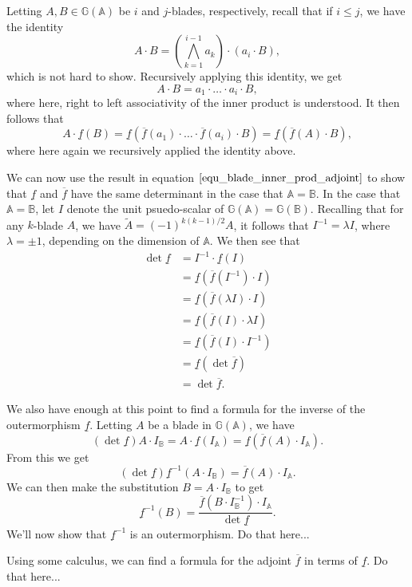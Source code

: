 \documentclass[12pt]{article}
\newcommand{\G}{\mathbb{G}}
\newcommand{\A}{\mathbb{A}}
\newcommand{\B}{\mathbb{B}}
\newcommand{\ob}{\overline}
\newcommand{\ub}{\underline}
\begin{document}
Letting $A,B\in\G(\A)$ be $i$ and $j$-blades, respectively, recall that if $i\leq j$, we
have the identity
\begin{equation*}
A\cdot B = \left(\bigwedge_{k=1}^{i-1}a_k\right)\cdot(a_i\cdot B),
\end{equation*}
which is not hard to show.  Recursively applying this identity, we get
\begin{equation*}
A\cdot B = a_1\cdot\dots\cdot a_i\cdot B,
\end{equation*}
where here, right to left associativity of the inner product is understood.
It then follows that
\begin{equation}\label{equ_blade_inner_prod_adjoint}
A\cdot\ub{f}(B) = \ub{f}\left(\ob{f}(a_1)\cdot\dots\cdot\ob{f}(a_i)\cdot B\right) = \ub{f}(\ob{f}(A)\cdot B),
\end{equation}
where here again we recursively applied the identity above.

We can now use the
result in equation $\eqref{equ_blade_inner_prod_adjoint}$ to show that $\ub{f}$ and $\ob{f}$
have the same determinant in the case that $\A=\B$.  In the case that $\A=\B$, let $I$
denote the unit psuedo-scalar of $\G(\A)=\G(\B)$.  
Recalling that for any $k$-blade $A$, we have $\tilde{A}=(-1)^{k(k-1)/2}A$, it follows
that $I^{-1}=\lambda I$, where $\lambda = \pm 1$, depending on the dimension of $\A$.
We then see that
\begin{align*}
\det\ub{f} &= I^{-1}\cdot\ub{f}(I) \\
 &= \ub{f}(\ob{f}(I^{-1})\cdot I) \\
 &= \ub{f}(\ob{f}(\lambda I)\cdot I) \\
 &= \ub{f}(\ob{f}(I)\cdot\lambda I) \\
 &= \ub{f}(\ob{f}(I)\cdot I^{-1}) \\
 &= \ub{f}(\det\ob{f}) \\
 &= \det\ob{f}.
\end{align*}

We also have enough at this point to find a formula for the inverse of
the outermorphism $\ub{f}$.  Letting $A$ be a blade in $\G(\A)$,
we have
\begin{equation*}
(\det\ub{f})A\cdot I_{\B} = A\cdot\ub{f}(I_{\A}) = \ub{f}(\ob{f}(A)\cdot I_{\A}).
\end{equation*}
From this we get
\begin{equation*}
(\det\ub{f})\ub{f}^{-1}(A\cdot I_{\B}) = \ob{f}(A)\cdot I_{\A}.
\end{equation*}
We can then make the substitution $B=A\cdot I_{\B}$ to get
\begin{equation}\label{equ_inv_of_outermorphism}
\ub{f}^{-1}(B) = \frac{\ob{f}(B\cdot I^{-1}_{\B})\cdot I_{\A}}{\det\ub{f}}.
\end{equation}
We'll now show that $\ub{f}^{-1}$ is an outermorphism.  Do that here...

Using some calculus, we can find a formula for the adjoint $\ob{f}$ in terms of $\ub{f}$.  Do that here...
\end{document}
